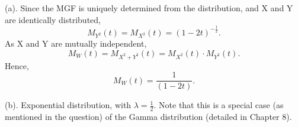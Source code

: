 (a). Since the MGF is uniquely determined from the distribution, and X and Y are identically distributed, \[M_{Y^2}(t) = M_{X^2}(t) = (1-2t)^{-\frac{1}{2}}.\]
As X and Y are mutually independent, \[M_{W}(t) = M_{X^2+Y^2}(t) =  M_{X^2}(t) \cdot M_{Y^2}(t).\]
Hence,\[M_{W}(t) = \frac{1}{(1-2t)}.\]

(b). Exponential distribution, with \(\lambda =\frac{1}{2}\). Note that this is a special case (as mentioned in the question) of the Gamma distribution (detailed in Chapter 8).
